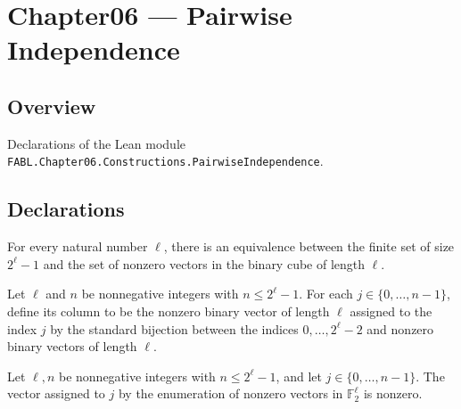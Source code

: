 \chapter{Chapter06 — Pairwise Independence}
\section{Overview}

Declarations of the Lean module \texttt{FABL.Chapter06.Constructions.PairwiseIndependence}.

\section{Declarations}

\begin{definition}
\label{FABL.nonzeroBinaryVectorEquiv}
\leanok
{}
For every natural number $\ell$, there is an equivalence between the finite set of size
$2^\ell-1$ and the set of nonzero vectors in the binary cube of length $\ell$.
\end{definition}

\begin{definition}
\label{FABL.pairwiseIndependentColumn}
\leanok
{}
Let $\ell$ and $n$ be nonnegative integers with $n\le 2^\ell-1$. For each
$j\in\{0,\ldots,n-1\}$, define its column to be the nonzero binary vector of length
$\ell$ assigned to the index $j$ by the standard bijection between the indices
$0,\ldots,2^\ell-2$ and nonzero binary vectors of length $\ell$.
\end{definition}

\begin{theorem}
\label{FABL.pairwiseIndependentColumn_ne_zero}
\leanok
{}
Let $\ell,n$ be nonnegative integers with $n\le 2^\ell-1$, and let
$j\in\{0,\ldots,n-1\}$. The vector assigned to $j$ by the enumeration of nonzero vectors
in $\mathbb F_2^\ell$ is nonzero.
\end{theorem}

